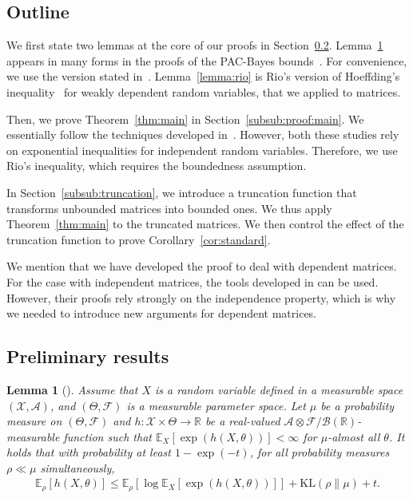 \documentclass[11pt,a4paper]{article}
\newtheorem{lemma}[theorem]{Lemma}
\theoremstyle{remark}
\theoremstyle{definition}
\theoremstyle{definition}
\newcommand{\Ep}{\mathbb{E}}
\begin{document}
\begin{bibunit}[apalike]
\subsection{Outline} \label{sec:proof_outline}

We first state two lemmas at the core of our proofs in Section~\ref{subsub:prelim}. Lemma~\ref{lemma:catoni} appears in many forms in the proofs of the PAC-Bayes bounds~\citep{cat2007,alquier2021user}. For convenience, we use the version stated in~\citep{catoni2017dimension,zhivotovskiy2021dimension}. Lemma~\ref{lemma:rio} is Rio's version of Hoeffding's inequality~\citep{rio2000inegalites} for weakly dependent random variables, that we applied to matrices.

Then, we prove Theorem~\ref{thm:main} in Section~\ref{subsub:proof:main}. We essentially follow the techniques developed in~\citep{catoni2017dimension,zhivotovskiy2021dimension}. However, both these studies rely on exponential inequalities for independent random variables. Therefore, we use Rio's inequality, which requires the boundedness assumption.

In Section~\ref{subsub:truncation}, we introduce a truncation function that transforms unbounded matrices into bounded ones. We thus apply Theorem~\ref{thm:main} to the truncated matrices. We then control the effect of the truncation function to prove Corollary~\ref{cor:standard}.


We mention that we have developed the proof to deal with dependent matrices. 
For the case with independent matrices, the tools developed in \citep{catoni2017dimension,zhivotovskiy2021dimension} can be used.
However, their proofs rely strongly on the independence property, which is why we needed to introduce new arguments for dependent matrices.


\subsection{Preliminary results}
\label{subsub:prelim}

\begin{lemma}[\citep{catoni2017dimension}]
\label{lemma:catoni}
Assume that $X$ is a random variable defined in a measurable space $\left(\mathcal{X},\mathcal{A}\right)$, and $\left(\Theta,\mathcal{F}\right)$ is a measurable parameter space.
Let $\mu$ be a probability measure on $\left(\Theta,\mathcal{F}\right)$ and $h:\mathcal{X}\times\Theta\to\mathbb{R}$ be a real-valued $\mathcal{A}\otimes\mathcal{F}/\mathcal{B}\left(\mathbb{R}\right)$-measurable function such that $\Ep_{X}[\exp\left(h\left(X,\theta\right)\right)]<\infty$ for $\mu$-almost all $\theta$.
It holds that with probability at least $1-\exp(-t)$, for all probability measures $\rho\ll \mu$ simultaneously,
\begin{align*}
    \Ep_{\rho}[h\left(X,\theta\right)]\le \Ep_{\rho}\left[\log\Ep_{X}\left[\exp\left(h\left(X,\theta\right)\right)\right]\right]+ \mathrm{KL}\left(\rho \| \mu\right)+t.
\end{align*}
\end{lemma}


\end{bibunit}
\end{document}
